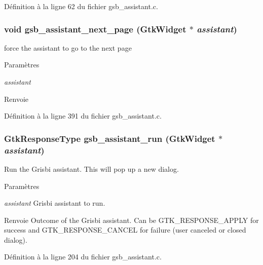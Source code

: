 Définition à la ligne 62 du fichier gsb\_\-assistant.c.

\subsubsection[{gsb\_\-assistant\_\-next\_\-page}]{\setlength{\rightskip}{0pt plus 5cm}void gsb\_\-assistant\_\-next\_\-page (GtkWidget $\ast$ {\em assistant})}\label{gsb__assistant_8c_afa94b439f0978b7eac4d469df5def613}
force the assistant to go to the next page


\begin{DoxyParams}{Paramètres}
\item[{\em assistant}]\end{DoxyParams}
\begin{DoxyReturn}{Renvoie}

\end{DoxyReturn}


Définition à la ligne 391 du fichier gsb\_\-assistant.c.

\subsubsection[{gsb\_\-assistant\_\-run}]{\setlength{\rightskip}{0pt plus 5cm}GtkResponseType gsb\_\-assistant\_\-run (GtkWidget $\ast$ {\em assistant})}\label{gsb__assistant_8c_a886a6fa8c458d71d7cfae7b54bd3187f}
Run the Grisbi assistant. This will pop up a new dialog.


\begin{DoxyParams}{Paramètres}
\item[{\em assistant}]Grisbi assistant to run.\end{DoxyParams}
\begin{DoxyReturn}{Renvoie}
Outcome of the Grisbi assistant. Can be GTK\_\-RESPONSE\_\-APPLY for success and GTK\_\-RESPONSE\_\-CANCEL for failure (user canceled or closed dialog). 
\end{DoxyReturn}


Définition à la ligne 204 du fichier gsb\_\-assistant.c.

